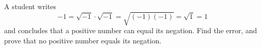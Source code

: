 A student writes
\[
-1=\sqrt{-1}\cdot\sqrt{-1}=\sqrt{(-1)(-1)}=\sqrt{1}=1
\]
and concludes that a positive number can equal its negation. Find the error, and prove that no positive number equals its negation.

